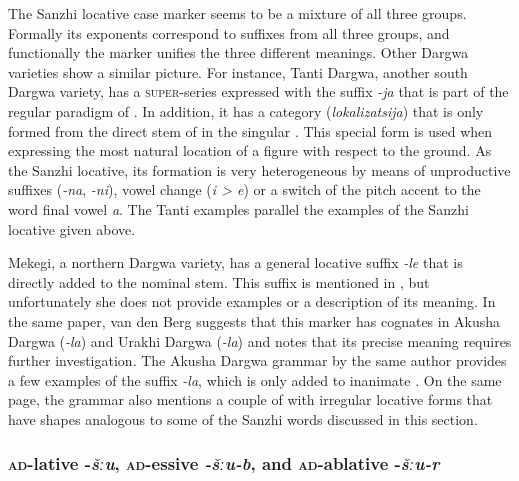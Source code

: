 The Sanzhi locative case marker seems to be a mixture of all three groups. Formally its exponents correspond to suffixes from all three groups, and functionally the marker unifies the three different meanings. Other Dargwa varieties show a similar picture. For instance, Tanti Dargwa, another south Dargwa variety, has a \textsc{super}-series expressed with the suffix \textit{-ja} that is part of the regular paradigm of . In addition, it has a category  (\textit{lokalizatsija}) that is only formed from the direct stem of  in the singular \citep[66]{Sumbatova.Lander2014}. This special form is used when expressing the most natural location of a figure with respect to the ground. As the Sanzhi locative, its formation is very heterogeneous by means of unproductive suffixes (\textit{-na}, \textit{-ni}), vowel change (\textit{i > e}) or a switch of the pitch accent to the word final vowel \textit{a}. The Tanti examples parallel the examples of the Sanzhi locative given above.

Mekegi, a northern Dargwa variety, has a general locative suffix \textit{-le} that is directly added to the nominal stem. This suffix is mentioned in , but unfortunately she does not provide examples or a description of its meaning. In the same paper, van den Berg suggests that this marker has cognates in Akusha Dargwa (\textit{-la}) and Urakhi Dargwa (\textit{-la}) and notes that its precise meaning requires further investigation. The Akusha Dargwa grammar by the same author provides a few examples of the suffix \textit{-la}, which is only added to inanimate  \citep[24]{vandenBerg2001}. On the same page, the grammar also mentions a couple of  with irregular locative forms that have shapes analogous to some of the Sanzhi words discussed in this section.




\subsubsection{\textsc{ad}-lative -\textit{šːu}, \textsc{ad}-essive \textit{-šːu-b}, and \textsc{ad}-ablative -\textit{šːu-r}}
\label{sssec:ad-lative -šːu, ad-essive -šːu-b, and ad-ablative -šːu-r}

